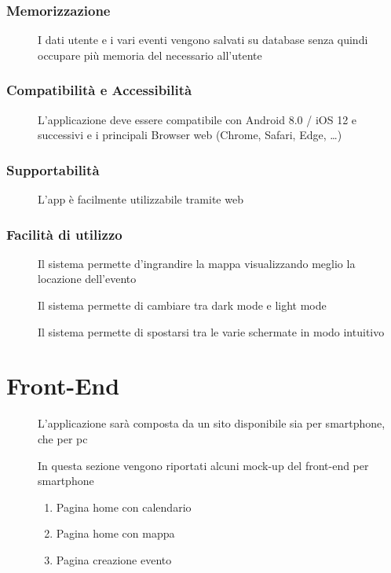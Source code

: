 \documentclass{article}
\let\origthesubsubsection\thesubsubsection
\begin{document}
\subsubsection{Memorizzazione} \label{rnf_5}
\begin{description}
    \item[] I dati utente e i vari eventi vengono salvati su database senza quindi occupare più memoria del necessario all'utente
\end{description}
\subsubsection{Compatibilità e Accessibilità} \label{rnf_6}
\begin{description}
    \item[] L’applicazione deve essere compatibile con Android 8.0 / iOS 12 e successivi e i principali Browser web (Chrome, Safari, Edge, \dots)
\end{description}
\subsubsection{Supportabilità} \label{rnf_7}
\begin{description}
    \item[] L'app è facilmente utilizzabile tramite web
\end{description}
\subsubsection{Facilità di utilizzo} \label{rnf_8}
\begin{description}
    \item[] Il sistema permette d'ingrandire la mappa visualizzando meglio la locazione dell'evento
    \item[] Il sistema permette di cambiare tra dark mode e light mode
    \item[] Il sistema permette di spostarsi tra le varie schermate in modo intuitivo
\end{description}
\renewcommand\thesubsubsection{\origthesubsubsection}
\clearpage
\section{Front-End}
\begin{description}
    \item[] L'applicazione sarà composta da un sito disponibile sia per smartphone, che per pc
    \item[] In questa sezione vengono riportati alcuni mock-up del front-end per smartphone
          \begin{enumerate}
              \item Pagina home con calendario
              \item Pagina home con mappa
              \item Pagina creazione evento
          \end{enumerate}
\end{description}
\end{document}
